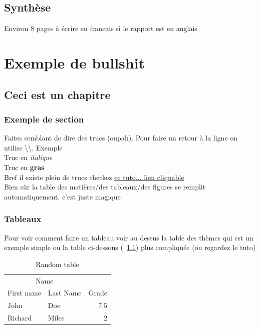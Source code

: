 \documentclass[twoside,10pt,openany,a4paper]{rapport}
\begin{document}
\chapter*{Synthèse}
Environ 8 pages à écrire en francais si le rapport est en anglais

\tableofcontents
{}
\listoftables
{}
\listoffigures
{}

\part{Exemple de bullshit}
\chapter{Ceci est un chapitre}
\section{Exemple de section}
Faites semblant de dire des trucs (oupah). Pour faire un retour à la ligne on utilise \textbackslash\textbackslash. Exemple\\
Truc en \textit{italique}\\
Truc en \textbf{gras}\\
Bref il existe plein de trucs checkez \href{http://fr.wikibooks.org/wiki/LaTeX/G\%C3\%A9n\%C3\%A9ralit\%C3\%A9s}{ce tuto... lien cliquable}\\
  Bien sûr la table des matières/des tableaux/des figures se remplit automatiquement, c'est juste magique\\

  \section{Tableaux}
  Pour voir comment faire un tableau voir au dessus la table des thèmes qui est un exemple simple ou la table ci-dessous (~\ref{randomtable}) plus compliquée (ou regardez le tuto)\\

  \begin{table}[h]
    \caption{\label{randomtable} Random table}
    \centering
    \begin{tabular}{llr}
      \toprule
      \multicolumn{2}{c}{Name} \\
      \cmidrule(r){1-2}
      First name & Last Name & Grade \\
      \midrule
      John & Doe & $7.5$ \\
      Richard & Miles & $2$ \\
      \bottomrule
    \end{tabular}
  \end{table}
\end{document}
